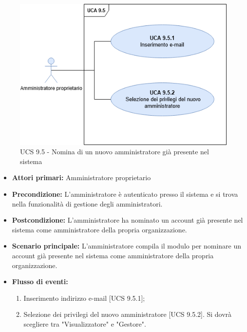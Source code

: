 \begin{figure}[h!]
    \centering
      \includegraphics[scale=0.5]{Sezioni/UseCase/Immagini/UCS9.5.png}
    \caption{UCS 9.5 - Nomina di un nuovo amministratore già presente nel sistema}
  \end{figure}


\begin{itemize}
\item \textbf{Attori primari:} Amministratore proprietario
\item \textbf{Precondizione:} L'amministratore è autenticato presso il sistema e si trova nella funzionalità di gestione degli amministratori.
\item \textbf{Postcondizione:} L'amministratore ha nominato un account già presente nel sistema come amministratore della propria organizzazione.
\item \textbf{Scenario principale:} L'amministratore compila il modulo per nominare un account già presente nel sistema come amministratore della propria organizzazione.
\item \textbf{Flusso di eventi:} %
  \begin{enumerate}
        \item Inserimento indirizzo e-mail [UCS 9.5.1];
        \item Selezione dei privilegi del nuovo amministratore [UCS 9.5.2]. Si dovrà scegliere tra "Visualizzatore" e "Gestore".
    \end{enumerate}
\end{itemize}

